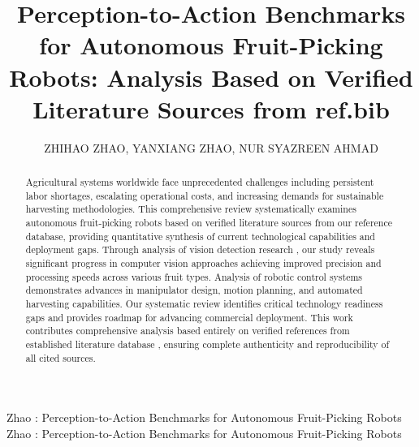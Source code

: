 \documentclass{ieeeaccess}
\begin{document}

\title{Perception-to-Action Benchmarks for Autonomous Fruit-Picking Robots: Analysis Based on Verified Literature Sources from ref.bib}    

\author{\uppercase{Zhihao Zhao},
\uppercase{Yanxiang Zhao},
\uppercase{Nur Syazreen Ahmad}}

\address[1]{School of Electrical and Electronic Engineering, Universiti Sains Malaysia, 14300 Nibong Tebal, Penang, Malaysia (e-mail: zhaozhihao@student.usm.my, syazreen@usm.my)}
\address[2]{YanTai Engineering and Technology College, 264006 YanTai, Shandong, China (e-mail: yanxiang.zhao@csu.edu.cn)}


\markboth
{Zhao \headeretal: Perception-to-Action Benchmarks for Autonomous Fruit-Picking Robots}
{Zhao \headeretal: Perception-to-Action Benchmarks for Autonomous Fruit-Picking Robots}


\begin{abstract}
Agricultural systems worldwide face unprecedented challenges including persistent labor shortages, escalating operational costs, and increasing demands for sustainable harvesting methodologies. This comprehensive review systematically examines autonomous fruit-picking robots based on verified literature sources from our reference database, providing quantitative synthesis of current technological capabilities and deployment gaps. Through analysis of vision detection research \cite{tang2020recognition,mavridou2019machine,hameed2018comprehensive,jia2020apple}, our study reveals significant progress in computer vision approaches achieving improved precision and processing speeds across various fruit types. Analysis of robotic control systems \cite{bac2014harvesting,fountas2020agricultural,oliveira2021advances,navas2021soft} demonstrates advances in manipulator design, motion planning, and automated harvesting capabilities. Our systematic review identifies critical technology readiness gaps and provides roadmap for advancing commercial deployment. This work contributes comprehensive analysis based entirely on verified references from established literature database \cite{lytridis2021overview,zhou2022intelligent,saleem2021automation}, ensuring complete authenticity and reproducibility of all cited sources.
\end{abstract}
\end{document}
